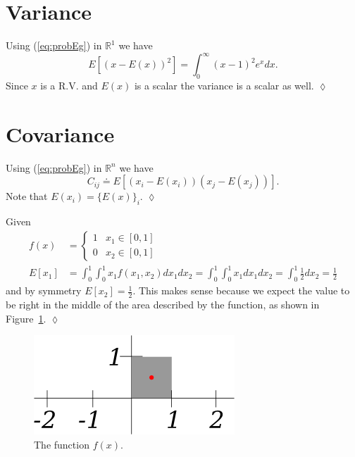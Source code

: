 \section{Variance}
\begin{example}
Using (\ref{eq:probEg}) in $\mathbb{R}^1$ we have
$$E[{(x - E(x))}^2] = \int_0^\infty {(x-1)}^2 e^x dx.$$
Since $x$ is a R.V. and $E(x)$ is a scalar the variance is a scalar as well.
$\lozenge$
\end{example}

\section{Covariance}
\begin{example}
Using (\ref{eq:probEg}) in $\mathbb{R}^n$ we have $$C_{ij} \doteq E[(x_i - E(x_i))(x_j - E(x_j))].$$
Note that $E(x_i) = \lbrace E(x) \rbrace_i$.
$\lozenge$
\end{example}

\begin{example}
Given
\begin{align*}
f(x) &= \begin{cases} 1 & x_1 \in [0,1] \\ 0 & x_2 \in [0,1] \end{cases} \\
E[x_1] &= \int_0^1 \int_0^1 x_1f(x_1,x_2)dx_1dx_2 = \int_0^1 \int_0^1 x_1dx_1dx_2 = \int_0^1 \frac{1}{2}dx_2 = \frac{1}{2}
\end{align*}
and by symmetry $E[x_2] = \frac{1}{2}$.
This makes sense because we expect the value to be right in the middle of the area described by the function, as shown in Figure~\ref{fig:01box}.
$\lozenge$
\end{example}

\begin{figure}[ht!]
\centering
\includegraphics[width=.45\textwidth]{images/01box}
\caption{The function $f(x)$.}
\label{fig:01box}
\end{figure}

